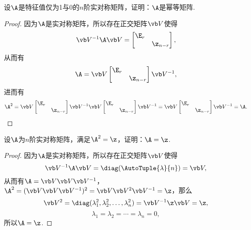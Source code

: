 \begin{example}
设\(\A\)是特征值仅为1与0的\(n\)阶实对称矩阵，证明：\(\A\)是幂等矩阵.
\begin{proof}
\def\M{\begin{bmatrix} \E_r \\ & \z_{n-r} \end{bmatrix}}%
因为\(\A\)是实对称矩阵，所以存在正交矩阵\(\Q\)使得\[
	\Q^{-1}\A\Q = \M,
\]
从而有\[
	\A = \Q\M\Q^{-1},
\]
进而有\[
	\A^2 = \Q\M\Q^{-1}\Q\M\Q^{-1} = \Q\M\Q^{-1} = \A.
	\qedhere
\]
\end{proof}
\end{example}

\begin{example}
设\(\A\)为\(n\)阶实对称矩阵，满足\(\A^2=\z\)，证明：\(\A=\z\).
\begin{proof}
因为\(\A\)是实对称矩阵，所以存在正交矩阵\(\Q\)使得\[
	\Q^{-1}\A\Q = \diag(\AutoTuple{\lambda}{n}) = \V,
\]
从而有\(\A = \Q\V\Q^{-1}\)，\(\A^2 = (\Q\V\Q^{-1})^2 = \Q\V^2\Q^{-1} = \z\)，那么\[
	\V^2 = \diag(\lambda_1^2,\lambda_2^2,\dotsc,\lambda_n^2) = \Q^{-1}\z\Q = \z,
\]\[
	\lambda_1=\lambda_2=\dotsb=\lambda_n = 0,
\]
所以\(\A=\z\).
\end{proof}
\end{example}
